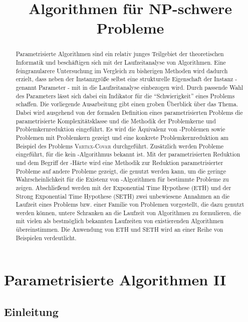 \documentclass[a4paper,ngerman]{atseminar}
\title{Algorithmen für NP-schwere Probleme}
\author{}
\begin{document}
\maketitle

\GERMAN

\section{Parametrisierte Algorithmen II}

\begin{abstract}
Parametrisierte Algorithmen sind ein relativ junges Teilgebiet der theoretischen Informatik und beschäftigen sich mit der
Laufzeitanalyse von Algorithmen. Eine feingranularere Untersuchung im Vergleich zu bisherigen Methoden wird dadurch erzielt,
dass neben der Instanzgröße selbst eine strukturelle Eigenschaft der Instanz - genannt Parameter - mit in die Laufzeitanalyse einbezogen wird.
Durch passende Wahl des Parameters lässt sich dabei ein Indikator für die \enquote{Schwierigkeit} eines Problems schaffen.
Die vorliegende Ausarbeitung gibt einen groben Überblick über das Thema.
Dabei wird ausgehend von der formalen Definition eines parametrisierten Problems die parametrisierte Komplexitätsklasse \FPT und
die Methodik der Problemkerne und Problemkernreduktion eingeführt. Es wird die Äquivalenz von \FPT-Problemen sowie Problemen mit Problemkern gezeigt und
eine konkrete Problemkernreduktion am Beispiel des Problems \textsc{Vertex-Cover} durchgeführt.
Zusätzlich werden Probleme eingeführt, für die kein \FPT-Algorithmus bekannt ist. Mit der parametrisierten Reduktion
und dem Begriff der \W{[1]}-Härte wird eine Methodik zur Reduktion parametrisierter Probleme auf andere Probleme gezeigt, die genutzt werden kann, um die geringe Wahrscheinlichkeit für die Existenz von \FPT-Algorithmen für
bestimmte Probleme zu zeigen.
Abschließend werden mit der Exponential Time Hypothese (ETH) und der Strong Exponential Time Hypothese (SETH) zwei unbewiesene
Annahmen an die Laufzeit eines Problems bzw. einer Familie von Problemen vorgestellt, die dazu genutzt werden können,
untere Schranken an die Laufzeit von Algorithmen zu formulieren, die mit vielen als bestmöglich bekannten Laufzeiten von existierenden Algorithmen
übereinstimmen. Die Anwendung von ETH und SETH wird an einer Reihe von Beispielen verdeutlicht.
\end{abstract}

\subsection{Einleitung}
\end{document}
